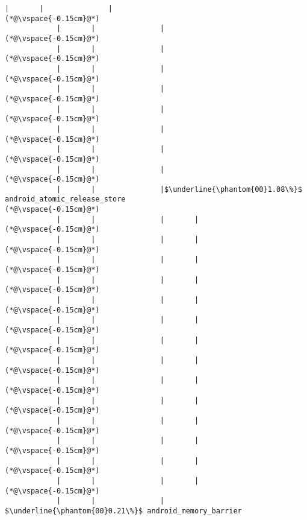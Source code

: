 \begin{lstlisting}[caption=Staattinen metodi Java$\to$C , label=profile:J2CBenchmark00001, numberbychapter=true, frame=lines, float, floatplacement=t]
            |       |               |
(*@\vspace{-0.15cm}@*)
            |       |               |
(*@\vspace{-0.15cm}@*)
            |       |               |
(*@\vspace{-0.15cm}@*)
            |       |               |
(*@\vspace{-0.15cm}@*)
            |       |               |
(*@\vspace{-0.15cm}@*)
            |       |               |
(*@\vspace{-0.15cm}@*)
            |       |               |
(*@\vspace{-0.15cm}@*)
            |       |               |
(*@\vspace{-0.15cm}@*)
            |       |               |
(*@\vspace{-0.15cm}@*)
            |       |               |$\underline{\phantom{00}1.08\%}$ android_atomic_release_store
(*@\vspace{-0.15cm}@*)
            |       |               |       |
(*@\vspace{-0.15cm}@*)
            |       |               |       |
(*@\vspace{-0.15cm}@*)
            |       |               |       |
(*@\vspace{-0.15cm}@*)
            |       |               |       |
(*@\vspace{-0.15cm}@*)
            |       |               |       |
(*@\vspace{-0.15cm}@*)
            |       |               |       |
(*@\vspace{-0.15cm}@*)
            |       |               |       |
(*@\vspace{-0.15cm}@*)
            |       |               |       |
(*@\vspace{-0.15cm}@*)
            |       |               |       |
(*@\vspace{-0.15cm}@*)
            |       |               |       |
(*@\vspace{-0.15cm}@*)
            |       |               |       |
(*@\vspace{-0.15cm}@*)
            |       |               |       |
(*@\vspace{-0.15cm}@*)
            |       |               |       |
(*@\vspace{-0.15cm}@*)
            |       |               |       |
(*@\vspace{-0.15cm}@*)
            |       |               |        $\underline{\phantom{00}0.21\%}$ android_memory_barrier

\end{lstlisting}
